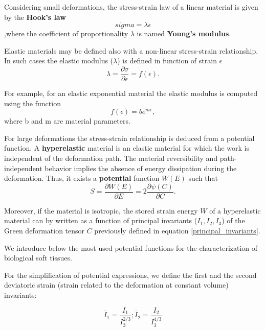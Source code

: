 Considering small deformations, the stress-strain law of a linear material is given by the \textbf{Hook's law}
\begin{equation}
sigma = \lambda \epsilon
\end{equation},where  the coefficient of proportionality $\lambda$  is named \textbf{Young's modulus}. 

 Elastic materials may be defined also with a non-linear stress-strain relationship. In such cases the elastic modulus ($\lambda $) is defined in function of strain $\epsilon$ 
 \begin{equation}
 \lambda = \frac{\partial \sigma}{\partial \epsilon} = f(\epsilon).
 \end{equation}

For example, for an elastic exponential material \citep{azar_methods_2002} the elastic modulus is computed using the function 
\begin{equation}
f(\epsilon) = b e^{m \epsilon},
\end{equation} 
where b and m are material parameters.
 
For large deformations the stress-strain relationship is deduced from a potential function. A \textbf{hyperelastic} material is an elastic material for which the work is independent of the deformation path. The material reversibility and path-independent behavior implies the absence of energy dissipation during the deformation. Thus, it exists a \textbf{potential} function $W(E)$ such that
\begin{equation}
 S = \frac{\partial W(E)}{\partial E}= 2\frac{\partial \psi (C)}{\partial C}.
\end{equation}

Moreover, if the material is isotropic, the stored strain energy $W$ of a hyperelastic material can by written as a function of principal invariants ($I_1, I_2, I_3$) of the Green deformation tensor $C$ previously defined in equation \ref{principal_invariants}.

We introduce below the most used potential functions for the characterization of biological soft tissues.
 
For the simplification of potential expressions, we define the first and the second deviatoric strain (strain related to the deformation at constant volume) invariants:

\begin{center}
\begin{equation}
\overline{I}_1=\frac{I_1}{I_3^{2/3}} ; \overline{I}_2=\frac{I_2}{I_3^{4/3}}
\end{equation}
\end{center}


